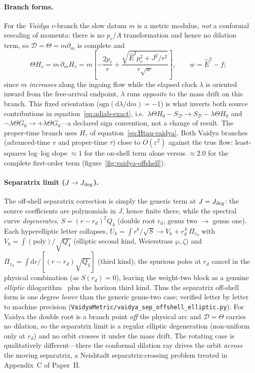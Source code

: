 \documentclass[12pt]{iopart}
\newcommand{\Ehat}{\hat E}
\newcommand{\Jc}{J_{\rm deg}}
\newcommand{\dd}{\mathrm{d}}
\begin{document}
\paragraph{Branch forms.} For the \emph{Vaidya} $v$-branch the slow datum $m$ is a metric
modulus, \emph{not} a conformal rescaling of momenta: there is no $p_r/A$ transformation
and hence no dilation term, so $\mathcal D=\Theta=m\partial_m$ is complete and
\begin{equation}
    \Theta H_v=m\,\partial_m H_v
    =m\!\left[-\frac{2p_r}{r}+\frac{\sqrt{\Ehat^2p_r^2+J^2/r^2}}{r\sqrt w}\right],
    \qquad w=\Ehat^2-f;
    \label{eq:ThetaHv}
\end{equation}
since $m$ \emph{increases} along the ingoing flow while the elapsed clock $\lambda$ is
oriented inward from the free-arrival endpoint, $\lambda$ runs \emph{opposite} to the mass
drift on this branch. This fixed orientation ($\mathrm{sgn}(\dd\lambda/\dd m)=-1$) is what
inverts both source contributions in equation~\eqref{eq:adiab-exact}, i.e.\
$\lambda\Theta H_0-S_{\mathcal D}\to S_{\mathcal D}-\lambda\Theta H_0$ and
$-\lambda\Theta G_0\to+\lambda\Theta G_0$---a declared sign convention, not a change of
result. The proper-time branch uses $H_\tau$ of equation~\eqref{eq:Htau-vaidya}. Both Vaidya branches (advanced-time $v$ and proper-time
$\tau$) close to $O(\varepsilon^2)$ against the true flow: least-squares log--log slope
$\approx1$ for the on-shell term alone versus $\approx2.0$ for the complete first-order
term (figure~\ref{fig:vaidya-offshell}).

\paragraph{Separatrix limit ($J\to\Jc$).} The off-shell separatrix correction is simply
the generic term at $J=\Jc$: the source coefficients are polynomials in $J$, hence finite
there, while the spectral curve \emph{degenerates}, $S=(r-r_d)^2Q_4$ (double root $r_d$,
genus two $\to$ genus one). Each hyperelliptic letter collapses,
$U_k=\int r^k/\sqrt S\to V_k+r_d^{\,k}\,\Pi_{r_d}$ with $V_k=\int(\text{poly})/\sqrt{Q_4}$
(elliptic second kind, Weierstrass $\wp,\zeta$) and $\Pi_{r_d}=\int\dd r/[(r-r_d)\sqrt{Q_4}]$
(third kind); the spurious poles at $r_d$ cancel in the physical combination (as
$S(r_d)=0$), leaving the weight-two block as a genuine \emph{elliptic}
dilogarithm~\cite{BeilinsonLevin1994,BrownLevin2011} plus the horizon third kind. Thus the
separatrix off-shell form is one degree \emph{lower} than the generic genus-two case;
verified letter by letter to machine precision
(\texttt{VaidyaMetric/vaidya\_sep\_offshell\_elliptic.py}). For Vaidya the double root is a
branch point \emph{off} the physical arc and $\mathcal D=\Theta$ carries no dilation, so
the separatrix limit is a regular elliptic degeneration (non-uniform only at $r_d$) and no
orbit crosses it under the mass drift. The rotating case is qualitatively
different---there the conformal dilation ray drives the orbit \emph{across} the moving
separatrix, a Neishtadt separatrix-crossing problem
\cite{Neishtadt1987,Neishtadt2013} treated in Appendix~C of Paper~II.
\end{document}
